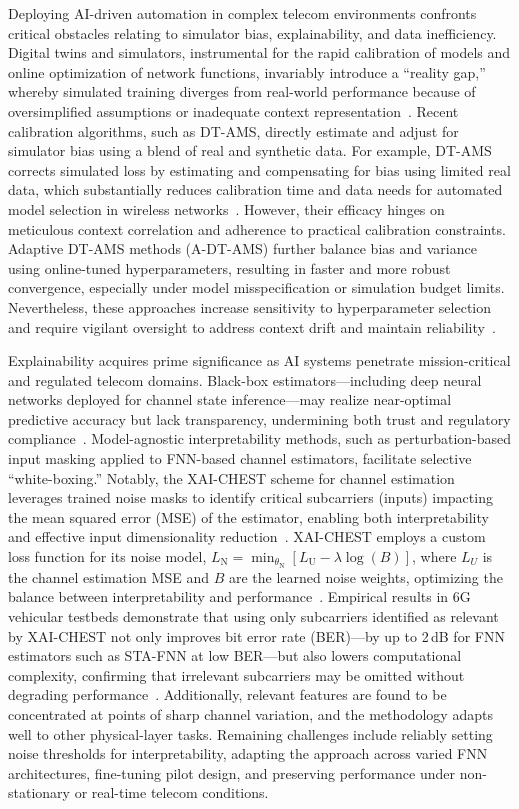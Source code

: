 \documentclass[sigconf]{acmart}
\begin{document}
Deploying AI-driven automation in complex telecom environments confronts critical obstacles relating to simulator bias, explainability, and data inefficiency. Digital twins and simulators, instrumental for the rapid calibration of models and online optimization of network functions, invariably introduce a ``reality gap,'' whereby simulated training diverges from real-world performance because of oversimplified assumptions or inadequate context representation~\cite{ref37,ref41}. Recent calibration algorithms, such as DT-AMS, directly estimate and adjust for simulator bias using a blend of real and synthetic data. For example, DT-AMS corrects simulated loss by estimating and compensating for bias using limited real data, which substantially reduces calibration time and data needs for automated model selection in wireless networks~\cite{ref37}. However, their efficacy hinges on meticulous context correlation and adherence to practical calibration constraints. Adaptive DT-AMS methods (A-DT-AMS) further balance bias and variance using online-tuned hyperparameters, resulting in faster and more robust convergence, especially under model misspecification or simulation budget limits. Nevertheless, these approaches increase sensitivity to hyperparameter selection and require vigilant oversight to address context drift and maintain reliability~\cite{ref37,ref41}.

Explainability acquires prime significance as AI systems penetrate mission-critical and regulated telecom domains. Black-box estimators—including deep neural networks deployed for channel state inference—may realize near-optimal predictive accuracy but lack transparency, undermining both trust and regulatory compliance~\cite{ref38}. Model-agnostic interpretability methods, such as perturbation-based input masking applied to FNN-based channel estimators, facilitate selective ``white-boxing.'' Notably, the XAI-CHEST scheme for channel estimation leverages trained noise masks to identify critical subcarriers (inputs) impacting the mean squared error (MSE) of the estimator, enabling both interpretability and effective input dimensionality reduction~\cite{ref38,ref41}. XAI-CHEST employs a custom loss function for its noise model, $L_\mathrm{N} = \min_{\theta_\mathrm{N}} [L_\mathrm{U} - \lambda \log(B)]$, where $L_U$ is the channel estimation MSE and $B$ are the learned noise weights, optimizing the balance between interpretability and performance~\cite{ref38,ref41}. Empirical results in 6G vehicular testbeds demonstrate that using only subcarriers identified as relevant by XAI-CHEST not only improves bit error rate (BER)—by up to 2\,dB for FNN estimators such as STA-FNN at low BER—but also lowers computational complexity, confirming that irrelevant subcarriers may be omitted without degrading performance~\cite{ref38,ref41}. Additionally, relevant features are found to be concentrated at points of sharp channel variation, and the methodology adapts well to other physical-layer tasks. Remaining challenges include reliably setting noise thresholds for interpretability, adapting the approach across varied FNN architectures, fine-tuning pilot design, and preserving performance under non-stationary or real-time telecom conditions.
\end{document}
